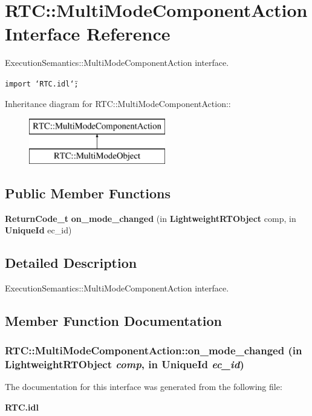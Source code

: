 \section{RTC::Multi\-Mode\-Component\-Action Interface Reference}
\label{interfaceRTC_1_1MultiModeComponentAction}
Execution\-Semantics::Multi\-Mode\-Component\-Action interface.  


{\tt import \char`\"{}RTC.idl\char`\"{};}

Inheritance diagram for RTC::Multi\-Mode\-Component\-Action::\begin{figure}[H]
\begin{center}
\leavevmode
\includegraphics[height=2cm]{interfaceRTC_1_1MultiModeComponentAction}
\end{center}
\end{figure}
\subsection*{Public Member Functions}
\begin{CompactItemize}
\item 
{\bf Return\-Code\_\-t} {\bf on\_\-mode\_\-changed} (in {\bf Lightweight\-RTObject} comp, in {\bf Unique\-Id} ec\_\-id)
\end{CompactItemize}


\subsection{Detailed Description}
Execution\-Semantics::Multi\-Mode\-Component\-Action interface. 



\subsection{Member Function Documentation}
\subsubsection{ RTC::Multi\-Mode\-Component\-Action::on\_\-mode\_\-changed (in {\bf Lightweight\-RTObject} {\em comp}, in {\bf Unique\-Id} {\em ec\_\-id})}\label{interfaceRTC_1_1MultiModeComponentAction_RTC_1_1MultiModeObjecta6}




The documentation for this interface was generated from the following file:\begin{CompactItemize}
\item 
{\bf RTC.idl}\end{CompactItemize}
